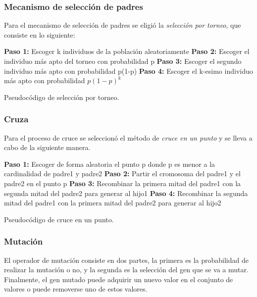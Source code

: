 \subsubsection{Mecanismo de selección de padres}

Para el mecanismo de selección de padres se eligió la \emph{selección por torneo}, que consiste en lo siguiente:

\begin{algorithm}[H] 
	\SetAlgoLined
	\textbf{Paso 1:} Escoger k individuos de la población aleatoriamente\;
	\textbf{Paso 2:} Escoger el individuo más apto del torneo con probabilidad p\;
	\textbf{Paso 3:} Escoger el segundo individuo más apto con probabilidad p(1-p) \;
	\textbf{Paso 4:} Escoger el k-esimo individuo más apto con probabilidad $p(1-p)^k$ \;
	\caption{Pseudocódigo de selección por torneo.}
\end{algorithm}

\subsubsection{Cruza}

Para el proceso de cruce se seleccionó el método de \emph{cruce en un punto} y se lleva a cabo de la siguiente manera.
\\
\begin{algorithm}[H] 
	\SetAlgoLined
	\textbf{Paso 1:} Escoger de forma aleatoria el punto p donde p es menor a la cardinalidad de padre1 y padre2\;
	\textbf{Paso 2:} Partir el cromosoma del padre1 y el padre2 en el punto p\;
	\textbf{Paso 3:} Recombinar la primera mitad del padre1 con la segunda mitad del padre2 para generar al hijo1\;
	\textbf{Paso 4:} Recombinar la segunda mitad del padre1 con la primera mitad del padre2 para generar al hijo2\;
	\caption{Pseudocódigo de cruce en un punto.}
\end{algorithm}

\subsubsection{Mutación}

El operador de mutación consiste en dos partes, la primera es la probabilidad de realizar la mutación o no, y la segunda es la selección del gen que se va a mutar.
\\
Finalmente, el gen mutado puede adquirir un nuevo valor en el conjunto de valores o puede removerse uno de estos valores.

